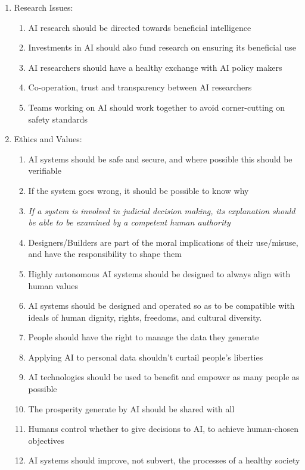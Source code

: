 \begin{enumerate}
    \item Research Issues:
    \begin{enumerate}
        \item AI research should be directed towards beneficial intelligence
        \item Investments in AI should also fund research on ensuring its beneficial use
        \item AI researchers should have a healthy exchange with AI policy makers
        \item Co-operation, trust and transparency between AI researchers
        \item Teams working on AI should work together to avoid corner-cutting on safety standards
    \end{enumerate}
    \item Ethics and Values:
    \begin{enumerate}
        \item AI systems should be safe and secure, and where possible this should be verifiable
        \item If the system goes wrong, it should be possible to know why
        \item \emph{If a system is involved in judicial decision making, its explanation should be able to be examined by a competent human authority}
        \item Designers/Builders are part of the moral implications of their use/misuse, and have the responsibility to shape them
        \item Highly autonomous AI systems should be designed to always align with human values
        \item AI systems should be designed and operated so as to be compatible with ideals of human dignity, rights, freedoms, and cultural diversity.
        \item People should have the right to manage the data they generate
        \item Applying AI to personal data shouldn't curtail people's liberties
        \item AI technologies should be used to benefit and empower as many people as possible
        \item The prosperity generate by AI should be shared with all
        \item Humans control whether to give decisions to AI, to achieve human-chosen objectives
        \item AI systems should improve, not subvert, the processes of a healthy society

\end{enumerate}
\end{enumerate}
